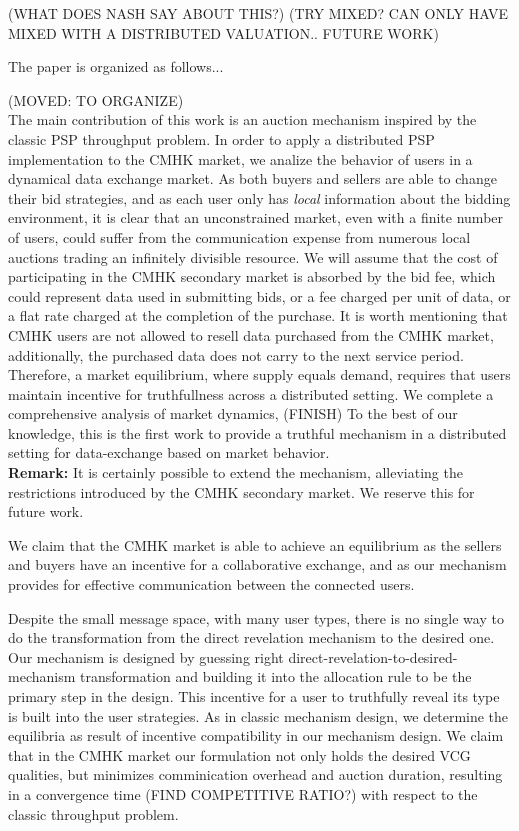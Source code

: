 \documentclass[sigconf, anonymous]{acmart}
\theoremstyle{definition}
\begin{document}
 (WHAT
DOES NASH SAY ABOUT THIS?) (TRY MIXED? CAN ONLY HAVE MIXED WITH A DISTRIBUTED
VALUATION.. FUTURE WORK) 

The paper is organized as follows...

(MOVED: TO ORGANIZE)\\
The main contribution of this work 
is an auction mechanism inspired by the classic PSP throughput problem. In
order to apply a distributed PSP implementation to the CMHK market,
we analize the behavior of users in a dynamical data exchange market. As both buyers and sellers are able
to change their bid strategies, and as each user only has \emph{local}
information about the bidding environment, it is clear that an unconstrained
market, even with a finite number of users, could suffer from the communication
expense from numerous local auctions trading an infinitely divisible resource.
We will assume that the cost of participating in the CMHK secondary market is
absorbed by the bid fee, which could represent data used in submitting bids, or
a fee charged per unit of data, or a flat rate charged at the completion of the
purchase. It is worth mentioning that CMHK users are not allowed to resell data
purchased from the CMHK
market, additionally, the purchased data does not carry to the next
service period. Therefore, a market equilibrium, where
supply equals demand, requires that users maintain incentive for truthfullness
across a distributed setting.
We complete a comprehensive analysis of market dynamics, (FINISH)
To the best of our knowledge, this is the first work to provide a truthful
mechanism in a distributed setting for data-exchange based on market behavior.
\\
\textbf{Remark:} It is certainly possible to extend the mechanism, alleviating the
restrictions introduced by the CMHK secondary market. We reserve this for
future work.

We claim that the CMHK market is
able to achieve an equilibrium as the sellers and buyers have an
incentive for a collaborative exchange, and as our mechanism provides
for effective communication between the connected users. 

Despite the small message space, with many user types, there is no single
way to do the transformation from the direct revelation mechanism to the
desired one. Our mechanism is designed by guessing
right direct-revelation-to-desired-mechanism transformation and building it
into the allocation rule to be the primary step in the design. This incentive for a user to
truthfully reveal its type is built into the user strategies. As in classic
mechanism design, we determine the equilibria as result of incentive
compatibility in our mechanism design. 
We claim that in the CMHK market our formulation not only holds the desired VCG qualities,
but minimizes comminication overhead 
and auction duration, resulting in a convergence time (FIND COMPETITIVE RATIO?)
with respect to the classic throughput problem. 
\end{document}
